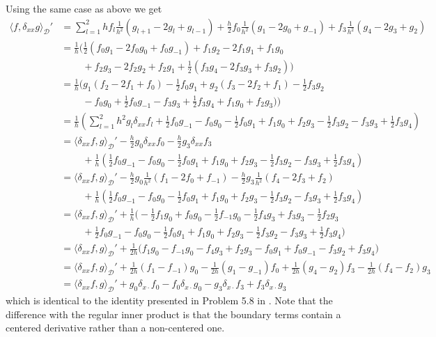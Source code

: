 \documentclass[dvipsnames]{article}
\begin{document}
Using the same case as above we get
\begin{equation}
\begin{aligned}
    \langle f,\delta_{xx}g \rangle_\mathcal{D}' &= \sum_{l=1}^2 h f_l\frac{1}{h^2}(g_{l+1}-2g_l+g_{l-1}) + \frac{h}{2}f_0\frac{1}{h^2}(g_1-2g_0+g_{-1}) + f_3 \frac{1}{h^2}(g_{4}-2g_3+g_2)\\
    &=\frac{1}{h}\Big(\frac{1}{2}(f_0g_1-2f_0g_0+f_0g_{-1})+f_1g_2-2f_1g_1+f_1g_0\\
    &\qquad\ +f_2g_3-2f_2g_2+f_2g_1+\frac{1}{2}(f_3g_4-2f_3g_3+f_3g_2)\Big)\\
    & = \frac{1}{h}\Big(g_1(f_2-2f_1+f_0)-\frac{1}{2}f_0g_1+g_2(f_3-2f_2+f_1)-\frac{1}{2}f_3g_2\\
    &\qquad\ -f_0g_0+\frac{1}{2}f_0g_{-1}-f_3g_3+\frac{1}{2}f_3g_4+f_1g_0+f_2g_3)\Big)\\
    &= \frac{1}{h}\left(\sum_{l=1}^2h^2g_l\delta_{xx}f_l+\frac{1}{2}f_0g_{-1}-f_0g_0-\frac{1}{2}f_0g_1+f_1g_0+f_2g_3-\frac{1}{2}f_3g_2-f_3g_3+\frac{1}{2}f_3g_4\right)\\
    &= \langle \delta_{xx}f,g\rangle_\mathcal{D}' -\frac{h}{2}g_0\delta_{xx}f_0-\frac{h}{2}g_3\delta_{xx}f_3\\
    &\qquad\ +\frac{1}{h}\left(\frac{1}{2}f_0g_{-1}-f_0g_0-\frac{1}{2}f_0g_1+f_1g_0+f_2g_3-\frac{1}{2}f_3g_2-f_3g_3+\frac{1}{2}f_3g_4\right)\\
    &= \langle \delta_{xx}f,g\rangle_\mathcal{D}' -\frac{h}{2}g_0\frac{1}{h^2}(f_1-2f_0+f_{-1})-\frac{h}{2}g_3\frac{1}{h^2}(f_4-2f_3+f_2)\\
    &\qquad\ +\frac{1}{h}\left(\frac{1}{2}f_0g_{-1}-f_0g_0-\frac{1}{2}f_0g_1+f_1g_0+f_2g_3-\frac{1}{2}f_3g_2-f_3g_3+\frac{1}{2}f_3g_4\right)\\
    &= \langle \delta_{xx}f,g\rangle_\mathcal{D}'+\frac{1}{h}\Big( -\frac{1}{2}f_1g_0+f_0g_0-\frac{1}{2}f_{-1}g_0-\frac{1}{2}f_4g_3+f_3g_3-\frac{1}{2}f_2g_3\\
    &\qquad\ +\frac{1}{2}f_0g_{-1}-f_0g_0-\frac{1}{2}f_0g_1+f_1g_0+f_2g_3-\frac{1}{2}f_3g_2-f_3g_3+\frac{1}{2}f_3g_4\Big)\\
    &= \langle \delta_{xx}f,g\rangle_\mathcal{D}'+\frac{1}{2h}\Big(f_1g_0-f_{-1}g_0-f_4g_3+f_2g_3-f_0g_1+f_0g_{-1}-f_3g_2+f_3g_4\Big)\\
    &= \langle \delta_{xx}f,g\rangle_\mathcal{D}'+\frac{1}{2h}(f_1-f_{-1})g_0 - \frac{1}{2h}(g_1-g_{-1})f_0+\frac{1}{2h}(g_4-g_2)f_3-\frac{1}{2h}(f_4-f_2)g_3\\
    &= \langle \delta_{xx}f,g\rangle_\mathcal{D}'+ g_0\delta_{x\cdot}f_0 - f_0\delta_{x\cdot}g_0-g_3\delta_{x\cdot}f_3+f_3\delta_{x\cdot}g_3
\end{aligned}
\end{equation}
which is identical to the identity presented in Problem 5.8 in \cite{Bilbao2009}. Note that the difference with the regular inner product is that the boundary terms contain a centered derivative rather than a non-centered one. 
\end{document}
